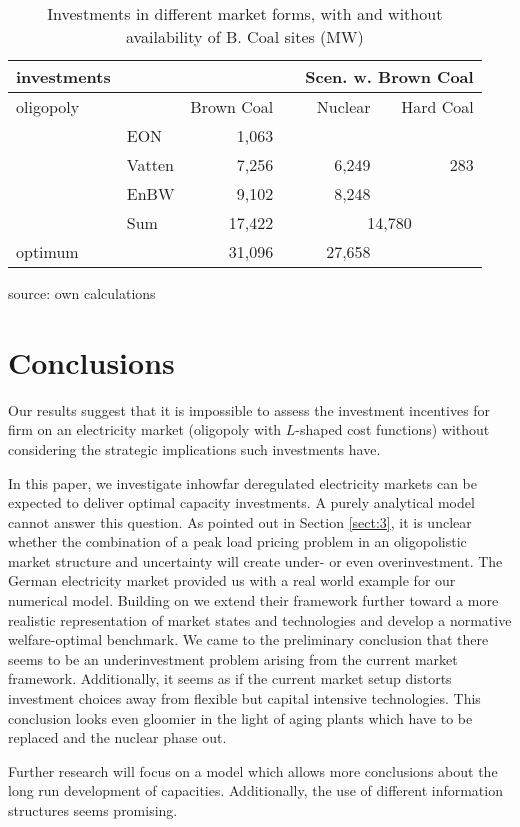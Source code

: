 \begin{table}
\centering
\caption{Investments in different market forms, with and without availability of B. Coal sites (MW)}
\begin{tabular}{llrrrr}
\hline
\hline
investments &            &            &            & \multicolumn{ 2}{r}{Scen. w. Brown Coal} \\
\hline
 oligopoly &            & Brown Coal &            &    Nuclear &  Hard Coal \\
\hline
           &        EON &       1,063 &            &            &            \\
           &     Vatten &       7,256 &            &       6,249 &        283 \\
           &       EnBW &       9,102 &            &       8,248 &            \\
           &        Sum &      17,422 &            & \multicolumn{ 2}{c}{14,780} \\
\hline
   optimum &            &      31,096 &            &      27,658 &            \\
\hline
\hline
\end{tabular}  

\label{tab:invest}
\begin{center}
source: own calculations
\end{center}
\end{table}

\section{Conclusions}

Our results suggest that it is impossible to assess the investment incentives for firm on an electricity market (oligopoly with $L$-shaped cost functions) without considering the strategic implications such investments have.

In this paper, we investigate inhowfar deregulated electricity markets can be expected to deliver optimal capacity investments. A purely analytical model cannot answer this question. As pointed out in Section \ref{sect:3}, it is unclear whether the combination of a peak load pricing problem in an oligopolistic market structure and uncertainty will create under- or even overinvestment. The German electricity market provided us with a real world example for our numerical model. Building on \cite{Genc2007} we extend their framework further toward a more realistic representation of market states and technologies and develop a normative welfare-optimal benchmark. We came to the preliminary conclusion that there seems to be an underinvestment problem arising from the current market framework. Additionally, it seems as if the current market setup distorts investment choices away from flexible but capital intensive technologies. This conclusion looks even gloomier in the light of aging plants which have to be replaced and the nuclear phase out.

Further research will focus on a model which allows more conclusions about the long run development of capacities. Additionally, the use of different information structures seems promising.


 

